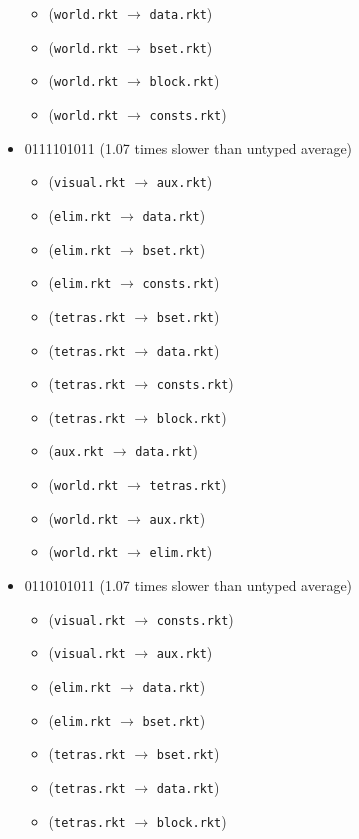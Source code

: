 \documentclass{article}
\newcommand{\mono}[1]{\texttt{#1}}
\begin{document}
\begin{itemize}
\begin{itemize}
  \item (\mono{world.rkt} $\rightarrow$ \mono{data.rkt})
  \item (\mono{world.rkt} $\rightarrow$ \mono{bset.rkt})
  \item (\mono{world.rkt} $\rightarrow$ \mono{block.rkt})
  \item (\mono{world.rkt} $\rightarrow$ \mono{consts.rkt})
  \end{itemize}
\item 0111101011 (1.07 times slower than untyped average)
  \begin{itemize}
  \item (\mono{visual.rkt} $\rightarrow$ \mono{aux.rkt})
  \item (\mono{elim.rkt} $\rightarrow$ \mono{data.rkt})
  \item (\mono{elim.rkt} $\rightarrow$ \mono{bset.rkt})
  \item (\mono{elim.rkt} $\rightarrow$ \mono{consts.rkt})
  \item (\mono{tetras.rkt} $\rightarrow$ \mono{bset.rkt})
  \item (\mono{tetras.rkt} $\rightarrow$ \mono{data.rkt})
  \item (\mono{tetras.rkt} $\rightarrow$ \mono{consts.rkt})
  \item (\mono{tetras.rkt} $\rightarrow$ \mono{block.rkt})
  \item (\mono{aux.rkt} $\rightarrow$ \mono{data.rkt})
  \item (\mono{world.rkt} $\rightarrow$ \mono{tetras.rkt})
  \item (\mono{world.rkt} $\rightarrow$ \mono{aux.rkt})
  \item (\mono{world.rkt} $\rightarrow$ \mono{elim.rkt})
  \end{itemize}
\item 0110101011 (1.07 times slower than untyped average)
  \begin{itemize}
  \item (\mono{visual.rkt} $\rightarrow$ \mono{consts.rkt})
  \item (\mono{visual.rkt} $\rightarrow$ \mono{aux.rkt})
  \item (\mono{elim.rkt} $\rightarrow$ \mono{data.rkt})
  \item (\mono{elim.rkt} $\rightarrow$ \mono{bset.rkt})
  \item (\mono{tetras.rkt} $\rightarrow$ \mono{bset.rkt})
  \item (\mono{tetras.rkt} $\rightarrow$ \mono{data.rkt})
  \item (\mono{tetras.rkt} $\rightarrow$ \mono{block.rkt})

\end{itemize}
\end{itemize}
\end{document}
